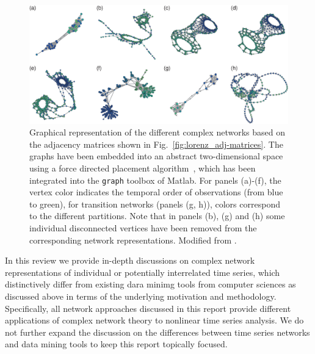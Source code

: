 \begin{figure}[htbp]
	\centering
	\includegraphics[width=\textwidth]{Chapter01_Introduction/lorenz_network.eps} 
\caption{Graphical representation of the different complex networks based on the adjacency matrices shown in Fig.~\ref{fig:lorenz_adj-matrices}. The graphs have been embedded into an abstract two-dimensional space using a force directed placement algorithm~\cite{Battista1994}, which has been integrated into the {\tt {graph}} toolbox of Matlab. For panels (a)-(f), the vertex color indicates the temporal order of observations (from blue to green), for transition networks (panels (g, h)), colors correspond to the different partitions. Note that in panels (b), (g) and (h) some individual disconnected vertices have been removed from the corresponding network representations. Modified from \cite{Donner2011}. } \label{fig:lorenz_network}
\end{figure}

    In this review we provide in-depth discussions on complex network representations of individual or potentially interrelated time series, which distinctively differ from existing dara minimg tools from computer sciences \cite{Zanin2016} as discussed above in terms of the underlying motivation and methodology. Specifically, all network approaches discussed in this report provide different applications of complex network theory to nonlinear time series analysis. We do not further expand the discussion on the differences between time series networks and data mining tools to keep this report topically focused.

